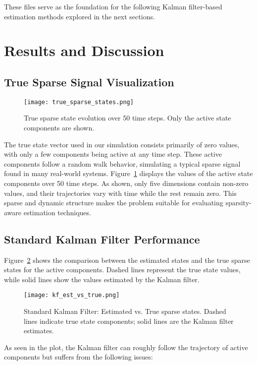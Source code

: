 \documentclass[12pt]{article}
\begin{document}
These files serve as the foundation for the following Kalman filter-based estimation methods explored in the next sections.

\section{Results and Discussion}

\subsection{True Sparse Signal Visualization}
\begin{figure}[h!]
  \centering
  \texttt{[image: true\_sparse\_states.png]}
  \caption{True sparse state evolution over 50 time steps. Only the active state components are shown.}
  \label{fig:sparse-true}
\end{figure}
The true state vector used in our simulation consists primarily of zero values, with only a few components being active at any time step. These active components follow a random walk behavior, simulating a typical sparse signal found in many real-world systems. Figure~\ref{fig:sparse-true} displays the values of the active state components over 50 time steps. As shown, only five dimensions contain non-zero values, and their trajectories vary with time while the rest remain zero. This sparse and dynamic structure makes the problem suitable for evaluating sparsity-aware estimation techniques.



\subsection{Standard Kalman Filter Performance}
Figure~\ref{fig:kf-standard} shows the comparison between the estimated states and the true sparse states for the active components. Dashed lines represent the true state values, while solid lines show the values estimated by the Kalman filter.

\begin{figure}[h!]
  \centering
  \texttt{[image: kf\_est\_vs\_true.png]}
  \caption{Standard Kalman Filter: Estimated vs. True sparse states. Dashed lines indicate true state components; solid lines are the Kalman filter estimates.}
  \label{fig:kf-standard}
\end{figure}

As seen in the plot, the Kalman filter can roughly follow the trajectory of active components but suffers from the following issues:
\end{document}
